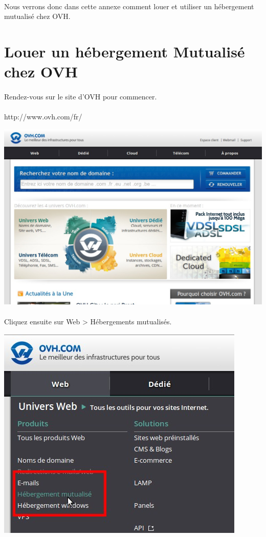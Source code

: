 \documentclass[10pt,a4paper]{article}
\begin{document}
\paragraph{}Nous verrons donc dans cette annexe comment louer et utiliser un hébergement mutualisé chez OVH.
\section{Louer un hébergement Mutualisé chez OVH}
\paragraph{}Rendez-vous sur le site d'OVH pour commencer.
\paragraph{}http://www.ovh.com/fr/
\begin{center}
\includegraphics[scale=0.3]{img/0269.png}
\end{center}
\newpage
\paragraph{}Cliquez ensuite sur Web > Hébergements mutualisés.
\begin{center}
\includegraphics[scale=0.3]{img/0270.png}
\end{center}
\end{document}
